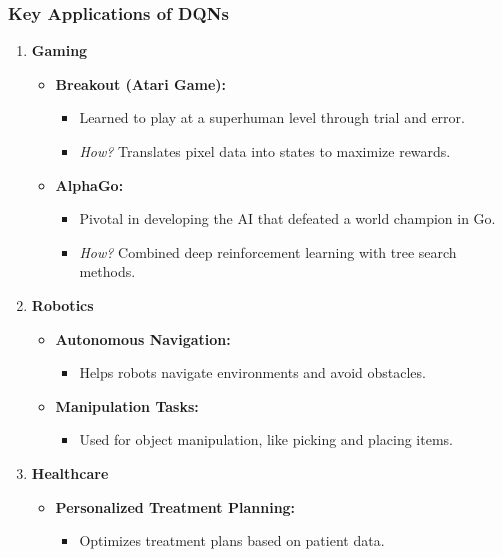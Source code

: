 \documentclass[aspectratio=169]{beamer}
\begin{document}
\begin{frame}[fragile]
    \frametitle{Key Applications of DQNs}
    \begin{enumerate}
        \item \textbf{Gaming}
        \begin{itemize}
            \item \textbf{Breakout (Atari Game):}
            \begin{itemize}
                \item Learned to play at a superhuman level through trial and error.
                \item \textit{How?} Translates pixel data into states to maximize rewards.
            \end{itemize}
            \item \textbf{AlphaGo:}
            \begin{itemize}
                \item Pivotal in developing the AI that defeated a world champion in Go.
                \item \textit{How?} Combined deep reinforcement learning with tree search methods.
            \end{itemize}
        \end{itemize}
        
        \item \textbf{Robotics}
        \begin{itemize}
            \item \textbf{Autonomous Navigation:}
            \begin{itemize}
                \item Helps robots navigate environments and avoid obstacles.
            \end{itemize}
            \item \textbf{Manipulation Tasks:}
            \begin{itemize}
                \item Used for object manipulation, like picking and placing items.
            \end{itemize}
        \end{itemize}
        
        \item \textbf{Healthcare}
        \begin{itemize}
            \item \textbf{Personalized Treatment Planning:}
            \begin{itemize}
                \item Optimizes treatment plans based on patient data.
            \end{itemize}
        \end{itemize}
    \end{enumerate}
\end{frame}
\end{document}
